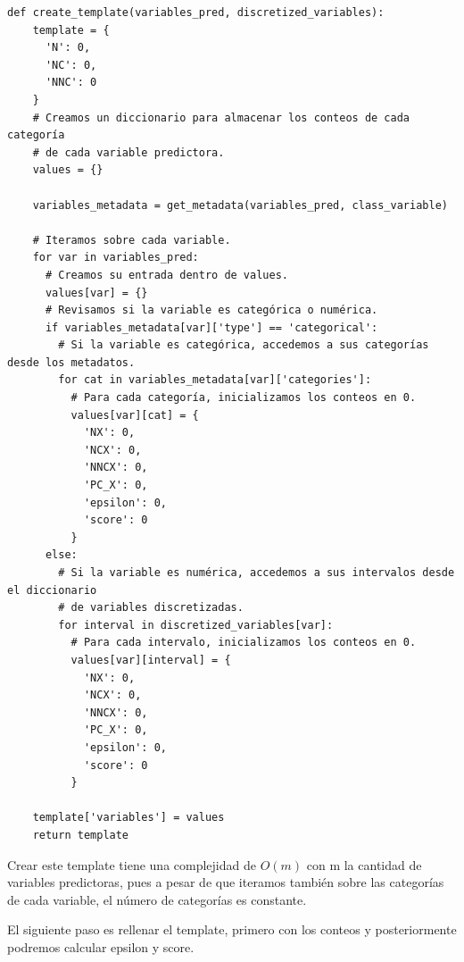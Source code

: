 \documentclass[
 12pt,
 letterpaper,
]{article}
\theoremstyle{teoremaBreak}
\theoremstyle{plain}
\theoremstyle{definition}
\begin{document}
\begin{lstlisting}[style=pseudocodigo]
  def create_template(variables_pred, discretized_variables):
    template = {
      'N': 0,
      'NC': 0,
      'NNC': 0
    }
    # Creamos un diccionario para almacenar los conteos de cada categoría
    # de cada variable predictora.
    values = {}

    variables_metadata = get_metadata(variables_pred, class_variable)

    # Iteramos sobre cada variable.
    for var in variables_pred:
      # Creamos su entrada dentro de values.
      values[var] = {}
      # Revisamos si la variable es categórica o numérica.
      if variables_metadata[var]['type'] == 'categorical':
        # Si la variable es categórica, accedemos a sus categorías desde los metadatos.
        for cat in variables_metadata[var]['categories']:
          # Para cada categoría, inicializamos los conteos en 0.
          values[var][cat] = {
            'NX': 0,
            'NCX': 0,
            'NNCX': 0,
            'PC_X': 0,
            'epsilon': 0,
            'score': 0
          }
      else:
        # Si la variable es numérica, accedemos a sus intervalos desde el diccionario
        # de variables discretizadas.
        for interval in discretized_variables[var]:
          # Para cada intervalo, inicializamos los conteos en 0.
          values[var][interval] = {
            'NX': 0,
            'NCX': 0,
            'NNCX': 0,
            'PC_X': 0,
            'epsilon': 0,
            'score': 0
          }

    template['variables'] = values
    return template

\end{lstlisting}

Crear este template tiene una complejidad de $O(m)$ con m la cantidad de variables predictoras, pues a pesar 
de que iteramos también sobre las categorías de cada variable, el número de categorías es constante.

El siguiente paso es rellenar el template, primero con los conteos y posteriormente podremos calcular 
epsilon y score. 
\end{document}
